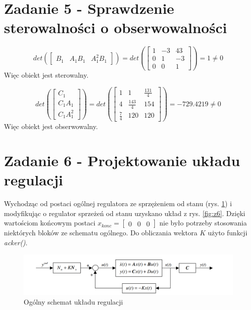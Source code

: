 \documentclass{article}
\begin{document}
\section{Zadanie 5 - Sprawdzenie sterowalności o obserwowalności}
\[det(\begin{bmatrix}B_1 & A_1B_1 & A^2_1B_1\end{bmatrix}) = 
det(\begin{bmatrix} 1 & -3 & 43\\ 0 & 1 & -3\\ 0 & 0 & 1 \end{bmatrix}) = 1 \neq 0\]
Więc obiekt jest sterowalny.

\[det(\begin{bmatrix}C_1 \\ C_1A_1 \\ C_1A^2_1\end{bmatrix}) = 
det(\begin{bmatrix} 1 & 1 & \frac{131}{4}\\ 4 & \frac{143}{4} & 154\\ \frac{7}{4} & 120 & 120 \end{bmatrix}) = -729.4219 \neq 0\]
Więc obiekt jest obserwowalny.

\section{Zadanie 6 - Projektowanie układu regulacji}
Wychodząc od postaci ogólnej regulatora ze sprzężeniem od stanu (rys. \ref{fig:z6_ogolny}) i modyfikując o regulator sprzeżeń od stanu uzyskano układ z rys. \ref{fig:z6}. Dzięki wartościom końcowym postaci $x_{konc} = \begin{bmatrix}
0 & 0 & 0
\end{bmatrix}$ nie było potrzeby stosowania niektórych bloków ze schematu ogólnego. Do obliczania wektora $K$ użyto funkcji \textit{acker()}.

\begin{figure}[H]
\centering
\includegraphics[width=0.9\linewidth]{z6_ogolny}
\caption{Ogólny schemat układu regulacji}
\label{fig:z6_ogolny}
\end{figure}
\end{document}
